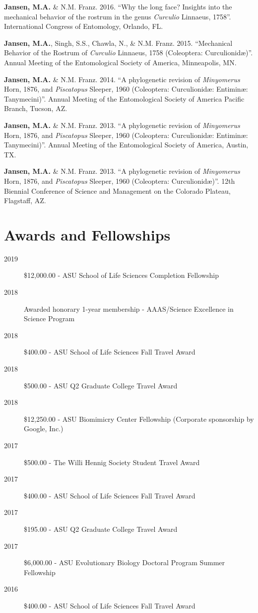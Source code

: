 \documentclass[12pt,a4paper]{article}
\begin{document}
\begin{description}
		\item \textbf{Jansen, M.A.} \& N.M. Franz. 2016. ``Why the long face? Insights into the mechanical behavior of the rostrum in the genus \textit{Curculio} Linnaeus, 1758''. International Congress of Entomology, Orlando, FL.
		\item \textbf{Jansen, M.A.}, Singh, S.S., Chawla, N., \& N.M. Franz. 2015. ``Mechanical Behavior of the Rostrum of \textit{Curculio} Linnaeus, 1758 (Coleoptera: Curculionid\ae)''. Annual Meeting of the Entomological Society of America, Minneapolis, MN.
		\item \textbf{Jansen, M.A.} \& N.M. Franz. 2014. ``A phylogenetic revision of \textit{Minyomerus} Horn, 1876, and \textit{Piscatopus} Sleeper, 1960 (Coleoptera: Curculionid\ae: Entimin\ae: Tanymecini)''. Annual Meeting of the Entomological Society of America Pacific Branch, Tucson, AZ.
		\item \textbf{Jansen, M.A.} \& N.M. Franz. 2013. ``A phylogenetic revision of \textit{Minyomerus} Horn, 1876, and \textit{Piscatopus} Sleeper, 1960 (Coleoptera: Curculionid\ae: Entimin\ae: Tanymecini)''. Annual Meeting of the Entomological Society of America, Austin, TX.
		\item \textbf{Jansen, M.A.} \& N.M. Franz. 2013. ``A phylogenetic revision of \textit{Minyomerus} Horn, 1876, and \textit{Piscatopus} Sleeper, 1960 (Coleoptera: Curculionid\ae)''. 12th Biennial Conference of Science and Management on the Colorado Plateau, Flagstaff, AZ.
	\end{description}

\section*{Awards and Fellowships}
	\begin{description}
		\item [2019] \$12,000.00 - ASU School of Life Sciences Completion Fellowship
		\item [2018] Awarded honorary 1-year membership - AAAS/Science Excellence in Science Program
		\item [2018] \$400.00 - ASU School of Life Sciences Fall Travel Award
		\item [2018] \$500.00 - ASU Q2 Graduate College Travel Award
		\item [2018] \$12,250.00 - ASU Biomimicry Center Fellowship (Corporate sponsorship by Google, Inc.)
		\item [2017] \$500.00 - The Willi Hennig Society Student Travel Award
		\item [2017] \$400.00 - ASU School of Life Sciences Fall Travel Award
		\item [2017] \$195.00 - ASU Q2 Graduate College Travel Award
		\item [2017] \$6,000.00 - ASU Evolutionary Biology Doctoral Program Summer Fellowship
		\item [2016] \$400.00 - ASU School of Life Sciences Fall Travel Award
	\end{description}
\end{document}
